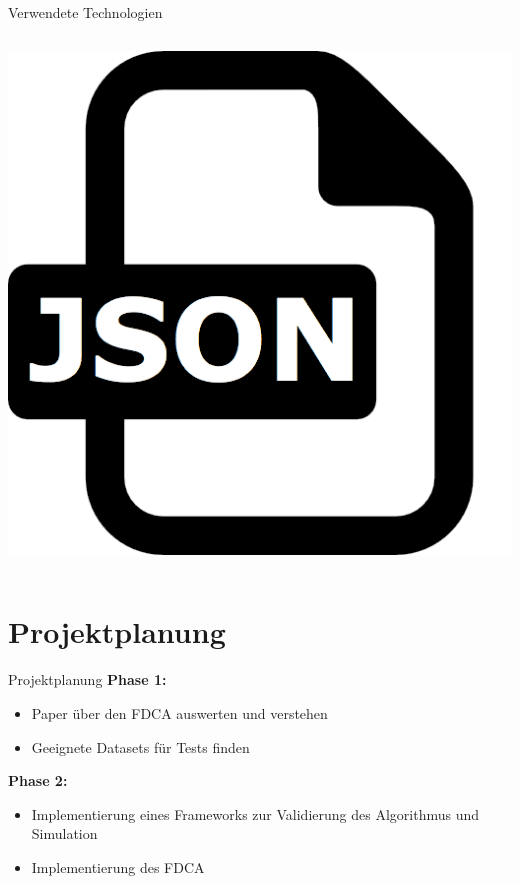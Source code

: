 \documentclass[12pt, xcolor={usenames,dvipsnames,svgnames,x11names,table}]{beamer}
\begin{document}
\begin{frame}{Verwendete Technologien}{}
\begin{columns}[c, onlytextwidth]
			\begin{column}{.5\textwidth}
				\center \includegraphics[scale=.08]{json}
			\end{column}
		\end{columns}
	\end{frame}
	
	
	\section{Projektplanung}
	\begin{frame}{Projektplanung}{}
		\textbf{Phase 1:}
		\begin{itemize}
			\item Paper über den FDCA auswerten und verstehen
			\item Geeignete Datasets für Tests finden
		\end{itemize}\bigskip
		
		\textbf{Phase 2:}
		\begin{itemize}
			\item Implementierung eines Frameworks zur Validierung des Algorithmus und Simulation
			\item Implementierung des FDCA
		\end{itemize}
	\end{frame}
	
\end{document}
